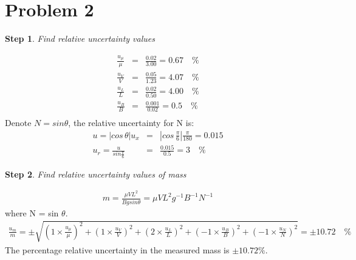 \documentclass[a4paper,11pt]{article}
\theoremstyle{mytheor}
\newtheorem{defi2}{Step}
\begin{document}
\section{Problem 2}
\begin{defi2}
Find relative uncertainty values
\end{defi2}
\begin{equation}
    \begin{array}{rcl}
           \frac{u_{\mu}}{\mu} & = & \frac{0.02}{3.00}   =  0.67 \quad \% \\
           \frac{u_{V}}{V} & = & \frac{0.05}{1.23}       =  4.07 \quad \% \\
           \frac{u_{L}}{L} & = & \frac{0.02}{0.50}       =  4.00 \quad \% \\
           \frac{u_{B}}{B} & = & \frac{0.001}{0.02}      =  0.5 \quad \% \\
    \end{array}
\end{equation}
Denote $N = sin \theta$, the relative uncertainty for N is: 
\begin{equation}
    \begin{array}{rcl}
          u  =  |cos \, \theta |u_x  &=&  |cos \, \frac{\pi}{6}|\frac{\pi}{180} = 0.015 \\    
          u_r   =  \frac{u}{sin \frac{\pi}{6}} & =&  \frac{0.015}{0.5} =3 \quad \%
    \end{array}
\end{equation}
\begin{defi2}
Find relative uncertainty values of mass
\end{defi2}
\begin{equation}
    \begin{array}{rcl}
          m  =  \frac{\mu V L^2}{Bgsin\theta} = \mu V L^2 g^{-1}B^{-1} N^{-1}    
    \end{array}
\end{equation}
where N = sin $\theta$.
\begin{equation}
    \begin{array}{rcl}
          \frac{u_m}{m}  = \pm \sqrt{(1 \times \frac{u_{\mu}}{\mu})^2+(1 \times \frac{u_V}{V})^2+(2 \times \frac{u_L}{L})^2+(-1\times \frac{u_B}{B})^2 + (-1 \times \frac{u_N}{N})^2 } = \pm 10.72 \quad \%  
    \end{array}
\end{equation}
The percentage relative uncertainty in the measured mass is $\pm 10.72 \%$.
\end{document}
